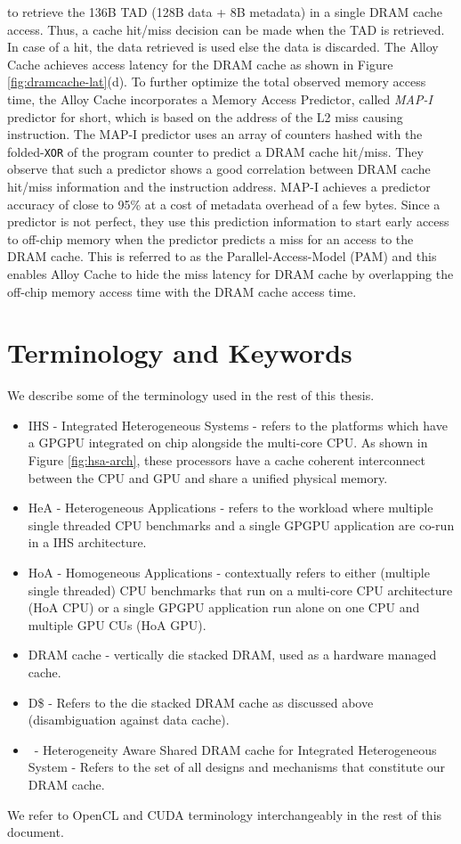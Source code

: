 to retrieve the 136B TAD (128B data + 8B metadata) in a single DRAM cache access. Thus, a cache hit/miss decision can be made when the TAD is retrieved. In case of a hit, the data retrieved is used else the data is discarded. The Alloy Cache achieves access latency for the DRAM cache as shown in Figure \ref{fig:dramcache-lat}(d). To further optimize the total observed memory access time, the Alloy Cache incorporates a Memory Access Predictor, called \textit{MAP-I} predictor \cite{alloy} for short, which is based on the address of the L2 miss causing instruction. The MAP-I predictor uses an array of counters hashed with the folded-{\tt XOR} of the program counter to predict a DRAM cache hit/miss. They observe that such a predictor shows a good correlation between DRAM cache hit/miss information and the instruction address. MAP-I achieves a predictor accuracy of close to 95\% at a cost of metadata overhead of a few bytes. Since a predictor is not perfect, they use this prediction information to start early access to off-chip memory when the predictor predicts a miss for an access to the DRAM cache. This is referred to as the Parallel-Access-Model (PAM) and this enables Alloy Cache to hide the miss latency for DRAM cache by overlapping the off-chip memory access time with the DRAM cache access time.

\section{Terminology and Keywords}
We describe some of the terminology used in the rest of this thesis.
\begin{itemize}
	\item IHS - Integrated Heterogeneous Systems - refers to the platforms which have a GPGPU integrated on chip alongside the multi-core CPU. As shown in Figure \ref{fig:hsa-arch}, these processors have a cache coherent interconnect between the CPU and GPU and share a unified physical memory.
	\item HeA - Heterogeneous Applications - refers to the workload where multiple single threaded CPU benchmarks and a single GPGPU application are co-run in a IHS architecture.
	\item HoA - Homogeneous Applications - contextually refers to either (multiple single threaded) CPU benchmarks that run on a multi-core CPU architecture (HoA CPU) or a single GPGPU application run alone on one CPU and multiple GPU CUs (HoA GPU).
	\item DRAM cache - vertically die stacked DRAM, used as a hardware managed cache.
	\item D\$ - Refers to the die stacked DRAM cache as discussed above (disambiguation against data cache).
	\item \cachename\ - Heterogeneity Aware Shared DRAM cache for Integrated Heterogeneous System - Refers to the set of all designs and mechanisms that constitute our DRAM cache.
\end{itemize}
We refer to OpenCL \cite{opencl} and CUDA \cite{cuda} terminology interchangeably in the rest of this document.



